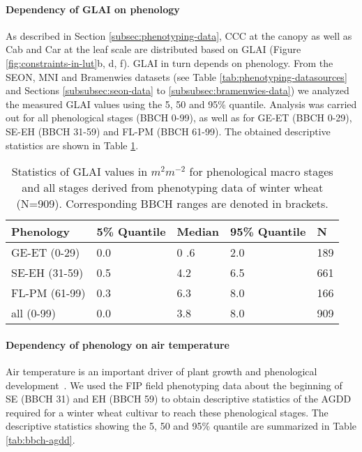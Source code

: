 \paragraph{Dependency of \gls{GLAI} on phenology}

As described in Section \ref{subsec:phenotyping-data}, \gls{CCC} at the canopy as well as \gls{Cab} and Car at the leaf scale are distributed based on \gls{GLAI} (Figure \ref{fig:constraints-in-lut}b, d, f). \gls{GLAI} in turn depends on phenology. From the SEON, MNI and Bramenwies datasets (see Table \ref{tab:phenotyping-datasources} and Sections \ref{subsubsec:seon-data} to \ref{subsubsec:bramenwies-data}) we analyzed the measured \gls{GLAI} values using the 5, 50 and 95\% quantile. Analysis was carried out for all phenological stages (BBCH 0-99), as well as for GE-ET (BBCH 0-29), SE-EH (BBCH 31-59) and FL-PM (BBCH 61-99). The obtained descriptive statistics are shown in Table \ref{tab:glai-data}.

\begin{table}[H]
\caption{Statistics of \gls{GLAI} values in $m^2 m^{-2}$ for phenological macro stages and all stages derived from phenotyping data of winter wheat (N=909). Corresponding BBCH ranges are denoted in brackets.}
\label{tab:glai-data}
\begin{tabularx}{\textwidth}{p{4cm}p{1.8cm}p{1.8cm}p{1.8cm}p{0.8cm}}
\toprule
\textbf{Phenology} & \textbf{5\% Quantile} & \textbf{Median} & \textbf{95\% Quantile} & \textbf{N} \\ \midrule
GE-ET (0-29)  & 0.0   & 0 .6 &  2.0 & 189  \\
SE-EH (31-59)   & 0.5  & 4.2 & 6.5  & 661  \\
FL-PM (61-99)   & 0.3 & 6.3 &  8.0 & 166  \\
all (0-99)   & 0.0  &  3.8  & 8.0  & 909  \\ \bottomrule
\end{tabularx}
\end{table}

\paragraph{Dependency of phenology on air temperature}

Air temperature is an important driver of plant growth and phenological development~\citep{parent_temperature_2012, roth_high-throughput_2022}. We used the FIP field phenotyping data about the beginning of SE (BBCH 31) and EH (BBCH 59) to obtain descriptive statistics of the AGDD required for a winter wheat cultivar to reach these phenological stages. The descriptive statistics showing the 5, 50 and 95\% quantile are summarized in Table \ref{tab:bbch-agdd}.


